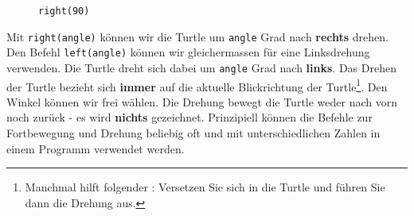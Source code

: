 \begin{figure}[htb]
{\begin{minipage}[c][4cm]{4cm}
\caption*{\lstinline{right(90)}}
\end{minipage}
}
\end{figure}

Mit \lstinline{right(angle)} können wir die Turtle um \lstinline{angle} Grad nach \textbf{rechts} drehen. Den Befehl \lstinline{left(angle)} können wir gleichermassen für eine Linksdrehung verwenden. Die Turtle dreht sich dabei um \lstinline{angle} Grad nach \textbf{links}. Das Drehen der Turtle bezieht sich \textbf{immer} auf die aktuelle Blickrichtung der Turtle\footnote{Manchmal hilft folgender : Versetzen Sie sich in die Turtle und führen Sie dann die Drehung aus.}. Den Winkel können wir frei wählen. Die Drehung bewegt die Turtle weder nach vorn noch zurück - es wird \textbf{nichts} gezeichnet. Prinzipiell können die Befehle zur Fortbewegung und Drehung beliebig oft und mit unterschiedlichen Zahlen in einem Programm verwendet werden.

